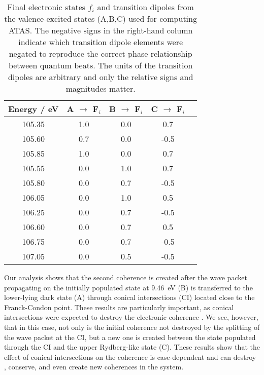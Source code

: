 \documentclass[12pt]{article}
\begin{document}
\begin{table}
\centering
\caption{\label{Tab3}Final electronic states $f_i$ and transition dipoles from the valence-excited states (A,B,C) used for computing ATAS. The negative signs in the right-hand column indicate which transition dipole elements were negated to reproduce the correct phase relationship between quantum beats. The units of the transition dipoles are arbitrary and only the relative signs and magnitudes matter.}
\vspace{0.3cm}
\begin{tabular}{ccccc} 
 \hline \hline
 Energy / eV & A $\to$ F$_i$ & B $\to$ F$_i$ & C $\to$ F$_i$ \\ 
 \hline
 105.35      & 1.0       & 0.0 &    0.7 \\
 105.60      & 0.7       & 0.0 & -0.5 \\
 105.85      & 1.0       & 0.0 &    0.7 \\
 \hline
 105.55      & 0.0       & 1.0 &    0.7 \\
 105.80      & 0.0       & 0.7 & -0.5 \\
 106.05      & 0.0       & 1.0 &    0.5 \\
 106.25      & 0.0       & 0.7 & -0.5 \\
 106.60      & 0.0       & 0.7 &    0.5 \\
 106.75      & 0.0       & 0.7 & -0.5 \\
 107.05      & 0.0       & 0.5 & -0.5 \\
 \hline
\end{tabular}
\end{table}

Our analysis shows that the second coherence is created after the wave packet propagating on the initially populated state at 9.46~eV (B) is transferred to the lower-lying dark state (A) through conical intersections (CI) located close to the Franck-Condon point. These results are particularly important, as conical intersections were expected to destroy the electronic coherence \cite{arnold2017electronic}. We see, however, that in this case, not only is the initial coherence not destroyed by the splitting of the wave packet at the CI, but a new one is created between the state populated through the CI and the upper Rydberg-like state (C). These results show that the effect of conical intersections on the coherence is case-dependent and can destroy \cite{arnold2017electronic}, conserve, and even create \cite{kowalewski15a} new coherences in the system. 
\end{document}
